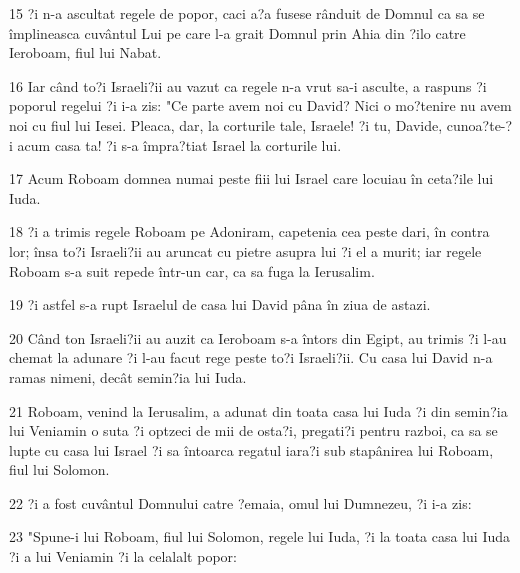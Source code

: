 \par 15 ?i n-a ascultat regele de popor, caci a?a fusese rânduit de Domnul ca sa se împlineasca cuvântul Lui pe care l-a grait Domnul prin Ahia din ?ilo catre Ieroboam, fiul lui Nabat.
\par 16 Iar când to?i Israeli?ii au vazut ca regele n-a vrut sa-i asculte, a raspuns ?i poporul regelui ?i i-a zis: "Ce parte avem noi cu David? Nici o mo?tenire nu avem noi cu fiul lui Iesei. Pleaca, dar, la corturile tale, Israele! ?i tu, Davide, cunoa?te-?i acum casa ta! ?i s-a împra?tiat Israel la corturile lui.
\par 17 Acum Roboam domnea numai peste fiii lui Israel care locuiau în ceta?ile lui Iuda.
\par 18 ?i a trimis regele Roboam pe Adoniram, capetenia cea peste dari, în contra lor; însa to?i Israeli?ii au aruncat cu pietre asupra lui ?i el a murit; iar regele Roboam s-a suit repede într-un car, ca sa fuga la Ierusalim.
\par 19 ?i astfel s-a rupt Israelul de casa lui David pâna în ziua de astazi.
\par 20 Când ton Israeli?ii au auzit ca Ieroboam s-a întors din Egipt, au trimis ?i l-au chemat la adunare ?i l-au facut rege peste to?i Israeli?ii. Cu casa lui David n-a ramas nimeni, decât semin?ia lui Iuda.
\par 21 Roboam, venind la Ierusalim, a adunat din toata casa lui Iuda ?i din semin?ia lui Veniamin o suta ?i optzeci de mii de osta?i, pregati?i pentru razboi, ca sa se lupte cu casa lui Israel ?i sa întoarca regatul iara?i sub stapânirea lui Roboam, fiul lui Solomon.
\par 22 ?i a fost cuvântul Domnului catre ?emaia, omul lui Dumnezeu, ?i i-a zis:
\par 23 "Spune-i lui Roboam, fiul lui Solomon, regele lui Iuda, ?i la toata casa lui Iuda ?i a lui Veniamin ?i la celalalt popor:
